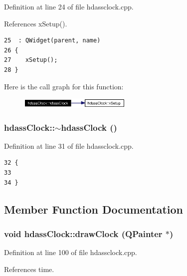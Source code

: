 Definition at line 24 of file hdassclock.cpp.

References x\-Setup().



\footnotesize\begin{verbatim}25  : QWidget(parent, name)
26 {
27    xSetup();
28 }
\end{verbatim}\normalsize 


Here is the call graph for this function:\begin{figure}[H]
\begin{center}
\leavevmode
\includegraphics[width=152pt]{classhdassClock_hdassClocka0_cgraph}
\end{center}
\end{figure}
\subsubsection{\setlength{\rightskip}{0pt plus 5cm}hdass\-Clock::$\sim${\bf hdass\-Clock} ()}\label{classhdassClock_hdassClocka2}




Definition at line 31 of file hdassclock.cpp.



\footnotesize\begin{verbatim}32 {
33 
34 }
\end{verbatim}\normalsize 


\subsection{Member Function Documentation}
\subsubsection{\setlength{\rightskip}{0pt plus 5cm}void hdass\-Clock::draw\-Clock (QPainter $\ast$)\hspace{0.3cm}{\tt  [protected]}}\label{classhdassClock_hdassClockb2}




Definition at line 100 of file hdassclock.cpp.

References time.

